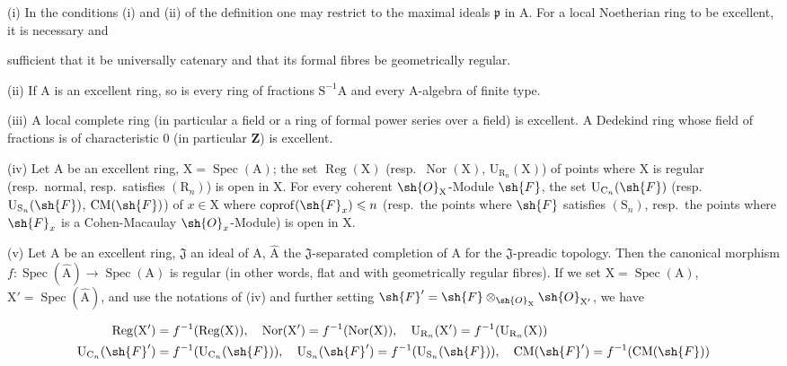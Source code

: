 \begin{env}[7.8.3]
\label{IV.7.8.3}
(i) In the conditions (i) and (ii) of the definition  one may restrict to the maximal ideals $\mathfrak{p}$ in $\mathrm{A}$. For a local Noetherian ring to be excellent, it is necessary and


sufficient that it be universally catenary and that its formal fibres be geometrically regular.

(ii) If $\mathrm{A}$ is an excellent ring, so is every ring of fractions $\mathrm{S}^{-1}\mathrm{A}$ and every $\mathrm{A}$-algebra of finite type.

(iii) A local complete ring (in particular a field or a ring of formal power series over a field) is excellent. A Dedekind ring whose field of fractions is of characteristic $0$ (in particular $\mathbf{Z}$) is excellent.

(iv) Let $\mathrm{A}$ be an excellent ring, $\mathrm{X}=\operatorname{Spec}(\mathrm{A})$; the set $\operatorname{Reg}(\mathrm{X})$ (resp.\ $\operatorname{Nor}(\mathrm{X})$, $\mathrm{U}_{\mathrm{R}_n}(\mathrm{X})$) of points where $\mathrm{X}$ is regular (resp.\ normal, resp.\ satisfies $(\mathrm{R}_n)$) is open in $\mathrm{X}$. For every coherent $\sh{O}_\mathrm{X}$-Module $\sh{F}$, the set $\mathrm{U}_{\mathrm{C}_n}(\sh{F})$ (resp.\ $\mathrm{U}_{\mathrm{S}_n}(\sh{F})$, $\mathrm{CM}(\sh{F})$) of $x\in\mathrm{X}$ where $\operatorname{coprof}(\sh{F}_x)\leqslant n$ (resp.\ the points where $\sh{F}$ satisfies $(\mathrm{S}_n)$, resp.\ the points where $\sh{F}_x$ is a Cohen-Macaulay $\sh{O}_x$-Module) is open in $\mathrm{X}$.

(v) Let $\mathrm{A}$ be an excellent ring, $\mathfrak{J}$ an ideal of $\mathrm{A}$, $\widehat{\mathrm{A}}$ the $\mathfrak{J}$-separated completion of $\mathrm{A}$ for the $\mathfrak{J}$-preadic topology. Then the canonical morphism $f:\operatorname{Spec}(\widehat{\mathrm{A}})\to\operatorname{Spec}(\mathrm{A})$ is regular (in other words, flat and with geometrically regular fibres). If we set $\mathrm{X}=\operatorname{Spec}(\mathrm{A})$, $\mathrm{X}'=\operatorname{Spec}(\widehat{\mathrm{A}})$, and use the notations of (iv) and further setting $\sh{F}'=\sh{F}\otimes_{\sh{O}_\mathrm{X}}\sh{O}_{\mathrm{X}'}$, we have

\begin{env}[7.8.3.1]
\label{IV.7.8.3.1}
\begin{align*}
  \operatorname{Reg}(\mathrm{X}')&=f^{-1}(\operatorname{Reg}(\mathrm{X})),\quad \operatorname{Nor}(\mathrm{X}')=f^{-1}(\operatorname{Nor}(\mathrm{X})),\quad \mathrm{U}_{\mathrm{R}_n}(\mathrm{X}')=f^{-1}(\mathrm{U}_{\mathrm{R}_n}(\mathrm{X}))\\
  \mathrm{U}_{\mathrm{C}_n}(\sh{F}')&=f^{-1}(\mathrm{U}_{\mathrm{C}_n}(\sh{F})),\quad \mathrm{U}_{\mathrm{S}_n}(\sh{F}')=f^{-1}(\mathrm{U}_{\mathrm{S}_n}(\sh{F})),\quad \mathrm{CM}(\sh{F}')=f^{-1}(\mathrm{CM}(\sh{F}))
\end{align*}
\end{env}


\end{env}
